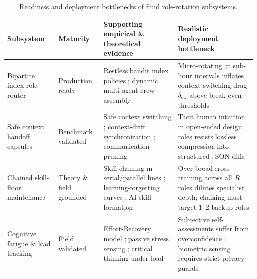 \documentclass[11pt]{article}
\begin{document}
\begin{table}[ht]
\centering
\small
\caption{Readiness and deployment bottlenecks of fluid role-rotation subsystems.}
\label{tab:readiness}
\begin{tabularx}{\textwidth}{@{}P{2.3cm}P{2.05cm}YY@{}}
\toprule
Subsystem & Maturity & Supporting empirical \& theoretical evidence & Realistic deployment bottleneck \\
\midrule
Bipartite index role router & Production ready & Restless bandit index policies \citep{whittle1988restless}; dynamic multi-agent crew assembly \citep{li2025argdesigner, zhang2025gdesigner} & Micro-rotating at sub-hour intervals inflates context-switching drag $\delta_{\mathrm{sw}}$ above break-even thresholds\\
Safe context handoff capsules & Benchmark validated & Safe context switching \citep{das2026safecontext}; context-drift synchronization \citep{rodrigues2026drift}; communication pruning \citep{zhang2025agentprune} & Tacit human intuition in open-ended design roles resists lossless compression into structured JSON diffs \\
Chained skill-floor maintenance & Theory \& field grounded & Skill-chaining in serial/parallel lines \citep{hopp2004chaining}; learning-forgetting curves \citep{jaber1996learning}; AI skill formation \citep{shen2026coding} & Over-broad cross-training across all $R$ roles dilutes specialist depth; chaining must target 1--2 backup roles\\
Cognitive fatigue \& load tracking & Field validated & Effort-Recovery model \citep{meijman1998effort}; passive stress sensing \citep{acan2026stress, jin2025cognitive}; critical thinking under load \citep{zhi2026timeconstraints} & Subjective self-assessments suffer from overconfidence \citep{eleftheriou2026confidence}; biometric sensing requires strict privacy guards \\
\bottomrule\end{tabularx}
\end{table}
\end{document}

